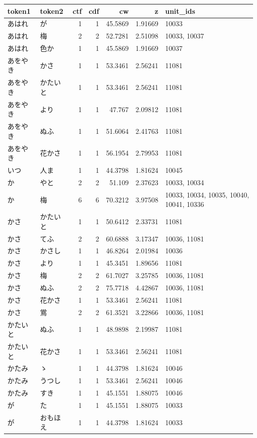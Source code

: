 \begin{tabular}{llrrrrl}
\hline
token1 & token2 & ctf & cdf & cw & z & unit\_ids \\
\hline
あはれ & が & 1 & 1 & 45.5869 & 1.91669 & 10033 \\
あはれ & 梅 & 2 & 2 & 52.7281 & 2.51098 & 10033, 10037 \\
あはれ & 色か & 1 & 1 & 45.5869 & 1.91669 & 10037 \\
あをやき & かさ & 1 & 1 & 53.3461 & 2.56241 & 11081 \\
あをやき & かたいと & 1 & 1 & 53.3461 & 2.56241 & 11081 \\
あをやき & より & 1 & 1 & 47.767 & 2.09812 & 11081 \\
あをやき & ぬふ & 1 & 1 & 51.6064 & 2.41763 & 11081 \\
あをやき & 花かさ & 1 & 1 & 56.1954 & 2.79953 & 11081 \\
いつ & 人ま & 1 & 1 & 44.3798 & 1.81624 & 10045 \\
か & やと & 2 & 2 & 51.109 & 2.37623 & 10033, 10034 \\
か & 梅 & 6 & 6 & 70.3212 & 3.97508 & 10033, 10034, 10035, 10040, 10041, 10336 \\
かさ & かたいと & 1 & 1 & 50.6412 & 2.33731 & 11081 \\
かさ & てふ & 2 & 2 & 60.6888 & 3.17347 & 10036, 11081 \\
かさ & かさし & 1 & 1 & 46.8264 & 2.01984 & 10036 \\
かさ & より & 1 & 1 & 45.3451 & 1.89656 & 11081 \\
かさ & 梅 & 2 & 2 & 61.7027 & 3.25785 & 10036, 11081 \\
かさ & ぬふ & 2 & 2 & 75.7718 & 4.42867 & 10036, 11081 \\
かさ & 花かさ & 1 & 1 & 53.3461 & 2.56241 & 11081 \\
かさ & 鴬 & 2 & 2 & 61.3521 & 3.22866 & 10036, 11081 \\
かたいと & ぬふ & 1 & 1 & 48.9898 & 2.19987 & 11081 \\
かたいと & 花かさ & 1 & 1 & 53.3461 & 2.56241 & 11081 \\
かたみ & ゝ & 1 & 1 & 44.3798 & 1.81624 & 10046 \\
かたみ & うつし & 1 & 1 & 53.3461 & 2.56241 & 10046 \\
かたみ & すき & 1 & 1 & 45.1551 & 1.88075 & 10046 \\
が & た & 1 & 1 & 45.1551 & 1.88075 & 10033 \\
が & おもほえ & 1 & 1 & 44.3798 & 1.81624 & 10033 \\

\end{tabular}
